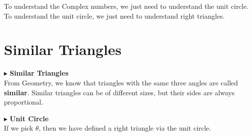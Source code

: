 \documentclass{ximera}
\begin{document}
To understand the Complex numbers, we just need to understand the unit circle.  To understand the unit circle, we just need to understand right triangles.














\section*{Similar Triangles}




$\blacktriangleright$ \textbf{\textcolor{blue!75!black}{Similar Triangles}}  \\

From Geometry, we know that triangles with the same three angles are called \textbf{similar}.  Similar triangles can be of different sizes, but their sides are always proportional.







$\blacktriangleright$ \textbf{\textcolor{blue!75!black}{Unit Circle}}  \\




If we pick $\theta$, then we have defined a right triangle via the unit circle.
\end{document}
